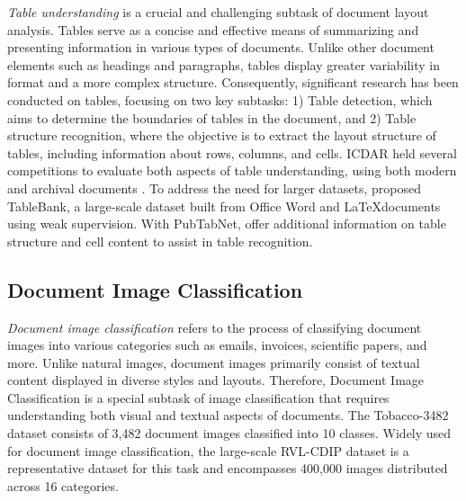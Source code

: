 \textit{Table understanding} is a crucial and challenging subtask of document layout analysis. Tables serve as a concise and effective means of summarizing and presenting information in various types of documents. Unlike other document elements such as headings and paragraphs, tables display greater variability in format and a more complex structure. Consequently, significant research has been conducted on tables, focusing on two key subtasks: 1) Table detection, which aims to determine the boundaries of tables in the document, and 2) Table structure recognition, where the objective is to extract the layout structure of tables, including information about rows, columns, and cells. ICDAR held several competitions to evaluate both aspects of table understanding, using both modern and archival documents \citep{gobel2013icdar, gao2019icdar}. To address the need for larger datasets, \citet{li2019tablebank} proposed TableBank, a large-scale dataset built from Office Word and \LaTeX documents using weak supervision. With PubTabNet, \citet{zhong2020image} offer additional information on table structure and cell content to assist in table recognition.



\subsection{Document Image Classification}

\textit{Document image classification} refers to the process of classifying document images into various categories such as emails, invoices, scientific papers, and more. Unlike natural images, document images primarily consist of textual content displayed in diverse styles and layouts. Therefore, Document Image Classification is a special subtask of image classification that requires understanding both visual and textual aspects of documents. The Tobacco-3482 dataset \citep{kumar2013unsupervised} consists of 3,482 document images classified into 10 classes. Widely used for document image classification, the large-scale RVL-CDIP dataset \citep{harley2015evaluation} is a representative dataset for this task and encompasses 400,000 images distributed across 16 categories. 



